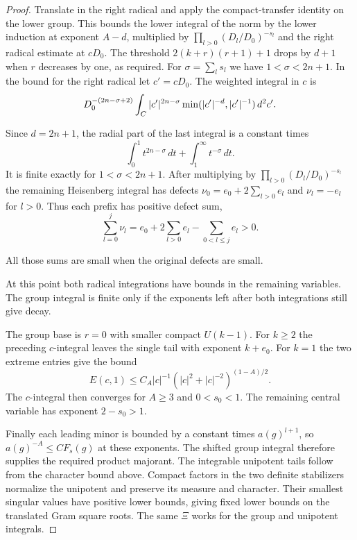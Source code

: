 \begin{proof}
Translate in the right radical and apply
the compact-transfer identity on the lower group.
This bounds the lower integral of the norm by
the lower induction at exponent \(A-d\), multiplied
by \(\prod_{l>0}(D_l/D_0)^{-s_l}\) and the right
radical estimate at \(cD_0\).
The threshold \(2(k+r)(r+1)+1\) drops by \(d+1\)
when \(r\) decreases by one, as required.
For \(\sigma=\sum_l s_l\) we have \(1<\sigma<2n+1\).
In the bound for the right radical let \(c'=cD_0\). The
weighted integral in \(c\) is
\[
 D_0^{-(2n-\sigma+2)}
   \int_{C}|c'|^{2n-\sigma}\min(|c'|^{-d},|c'|^{-1})\,d^2c' .
\]

Since \(d=2n+1\), the radial part of the last integral is
a constant times
\[
    \int_0^1 t^{2n-\sigma}\,dt
        +\int_1^\infty t^{-\sigma}\,dt .
\]
It is finite exactly for \(1<\sigma<2n+1\).
After multiplying by \(\prod_{l>0}(D_l/D_0)^{-s_l}\)
the remaining Heisenberg integral has defects
\(\nu_0=e_0+2\sum_{l>0}e_l\) and \(\nu_l=-e_l\) for \(l>0\).
Thus each prefix has positive defect sum,
\[
 \sum_{l=0}^j\nu_l=e_0+2\sum_{l>0}e_l-\sum_{0<l\le j}e_l>0.
\]

All those sums are small when the original defects are small.


At this point both radical integrations have bounds in the remaining variables. The group integral is finite only if the exponents left after both integrations still give decay.


The group base is \(r=0\) with smaller compact
\(U(k-1)\). For \(k\ge2\) the preceding \(c\)-integral
leaves the single tail with exponent \(k+e_0\).
For \(k=1\) the two extreme entries give the bound
\[
 E(c,1)\le C_A |c|^{-1}(|c|^2+|c|^{-2})^{(1-A)/2}.
\]
The \(c\)-integral then converges for \(A\ge3\) and
\(0<s_0<1\). The remaining central variable has
exponent \(2-s_0>1\).

Finally each leading minor is bounded by a constant
times \(a(g)^{l+1}\), so \(a(g)^{-A}\le C F_s(g)\)
at these exponents. The shifted group integral
therefore supplies the required product majorant.
The integrable unipotent tails follow from the
character bound above. Compact factors in the two
definite stabilizers normalize the unipotent and
preserve its measure and character. Their smallest
singular values have positive lower bounds, giving
fixed lower bounds on the translated Gram square
roots. The same \(\Xi\) works for the group and
unipotent integrals.
\end{proof}
